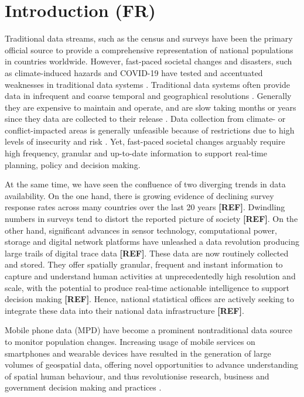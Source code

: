 \documentclass[]{rsos}%
\begin{document}
\newpage

\section{Introduction (FR)}\label{introduction-fr}

Traditional data streams, such as the census and surveys have been the
primary official source to provide a comprehensive representation of
national populations in countries worldwide. However, fast-paced
societal changes and disasters, such as climate-induced hazards and
COVID-19 have tested and accentuated weaknesses in traditional data
systems \citep{green2021}. Traditional data systems often provide data in
infrequent and coarse temporal and geographical resolutions
\citep{rowe23-bigdata}. Generally they are expensive to maintain and operate,
and are slow taking months or years since they data are collected to
their release \citep{rowe23-bigdata}. Data collection from climate- or
conflict-impacted areas is generally unfeasible because of restrictions
due to high levels of insecurity and risk \citep{iradukunda2025}. Yet,
fast-paced societal changes arguably require high frequency, granular
and up-to-date information to support real-time planning, policy and
decision making.

At the same time, we have seen the confluence of two diverging trends in
data availability. On the one hand, there is growing evidence of
declining survey response rates across many countries over the last 20
years \textbf{{[}REF{]}}. Dwindling numbers in surveys tend to distort the
reported picture of society \textbf{{[}REF{]}}. On the other hand, significant
advances in sensor technology, computational power, storage and digital
network platforms have unleashed a data revolution producing large
trails of digital trace data \textbf{{[}REF{]}}. These data are now routinely
collected and stored. They offer spatially granular, frequent and
instant information to capture and understand human activities at
unprecedentedly high resolution and scale, with the potential to produce
real-time actionable intelligence to support decision making \textbf{{[}REF{]}}.
Hence, national statistical offices are actively seeking to integrate
these data into their national data infrastructure \textbf{{[}REF{]}}.

Mobile phone data (MPD) have become a prominent nontraditional data
source to monitor population changes. Increasing usage of mobile
services on smartphones and wearable devices have resulted in the
generation of large volumes of geospatial data, offering novel
opportunities to advance understanding of spatial human behaviour, and
thus revolutionise research, business and government decision making and
practices \citep{rowe23-bigdata}.
\end{document}
